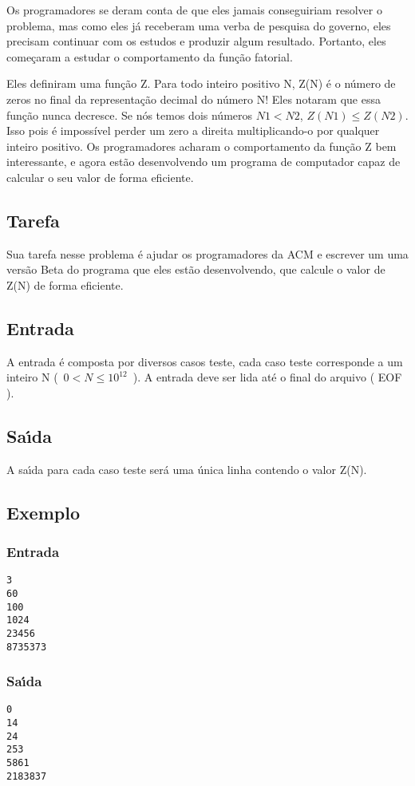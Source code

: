\documentclass[14pt]{article}
\begin{document}
Os programadores se deram conta de que eles jamais conseguiriam resolver o problema, mas como eles j\'a receberam uma verba de pesquisa do governo, eles precisam continuar com os estudos e produzir algum resultado. Portanto, eles come\c{c}aram a estudar o comportamento da fun\c{c}\~ao fatorial.

Eles definiram uma fun\c{c}\~ao Z. Para todo inteiro positivo N,  Z(N) \'e o n\'umero de zeros no final da representa\c{c}\~ao decimal do n\'umero N!
Eles notaram que essa fun\c{c}\~ao nunca decresce. Se n\'os temos dois n\'umeros $N1 < N2$, $ Z(N1) \leq Z(N2)$. Isso pois \'e imposs\'ivel perder um zero a direita multiplicando-o por qualquer inteiro positivo. Os programadores acharam o comportamento da fun\c{c}\~ao Z bem interessante, e agora est\~ao desenvolvendo um programa de computador capaz de calcular o seu valor de forma eficiente.


\subsection{Tarefa}
Sua tarefa nesse problema \'e ajudar os programadores da ACM e escrever um uma vers\~ao Beta do programa que eles est\~ao desenvolvendo, que calcule o valor de Z(N) de forma eficiente.

\subsection{Entrada}
A entrada \'e composta por diversos casos teste, cada caso teste corresponde a um inteiro N (\ $0 < N \leq 10^{12} $\ ). A entrada deve ser lida at\'e o final do arquivo ( EOF ).


\subsection{Sa\'{\i}da}
A sa\'{\i}da para cada caso teste ser\'a uma \'unica linha contendo o valor Z(N).

\subsection{Exemplo}
\subsubsection{Entrada}
\begin{verbatim}
3
60
100
1024
23456
8735373
 \end{verbatim}
\subsubsection{Sa\'{\i}da}
 \begin{verbatim}
0
14
24
253
5861
2183837
 \end{verbatim}
\end{document}
